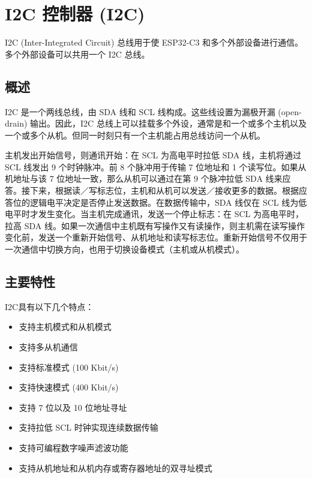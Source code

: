 \documentclass[main\_\_CN.tex]{subfiles}
\begin{document}

\ifglobal
\else
    {\let\clearpage\relax \listoftodos}
    \tableofcontents
\fi



\hypertarget{i2c}{}
\chapter{I2C 控制器 (I2C)}
\label{mod:i2c}



I2C (Inter-Integrated Circuit) 总线用于使 ESP32-C3 和多个外部设备进行通信。多个外部设备可以共用一个 I2C 总线。


\section{概述}
I2C 是一个两线总线，由 SDA 线和 SCL 线构成。这些线设置为漏极开漏 (open-drain) 输出。因此，I2C 总线上可以挂载多个外设，通常是和一个或多个主机以及一个或多个从机。但同一时刻只有一个主机能占用总线访问一个从机。

主机发出开始信号，则通讯开始：在 SCL 为高电平时拉低 SDA 线，主机将通过 SCL 线发出 9 个时钟脉冲。前 8 个脉冲用于传输 7 位地址和 1 个读写位。如果从机地址与该 7 位地址一致，那么从机可以通过在第 9 个脉冲拉低 SDA 线来应答。接下来，根据读／写标志位，主机和从机可以发送／接收更多的数据。根据应答位的逻辑电平决定是否停止发送数据。在数据传输中，SDA 线仅在 SCL 线为低电平时才发生变化。当主机完成通讯，发送一个停止标志：在 SCL 为高电平时，拉高 SDA 线。如果一次通信中主机既有写操作又有读操作，则主机需在读写操作变化前，发送一个重新开始信号、从机地址和读写标志位。重新开始信号不仅用于一次通信中切换方向，也用于切换设备模式（主机或从机模式）。

\section{主要特性}

I2C具有以下几个特点：

\begin{itemize}
    \item 支持主机模式和从机模式
    \item 支持多从机通信
    \item 支持标准模式 (100 Kbit/s)
    \item 支持快速模式 (400 Kbit/s)
    \item 支持 7 位以及 10 位地址寻址
    \item 支持拉低 SCL 时钟实现连续数据传输
    \item 支持可编程数字噪声滤波功能
    \item 支持从机地址和从机内存或寄存器地址的双寻址模式
\end{itemize}
\end{document}
